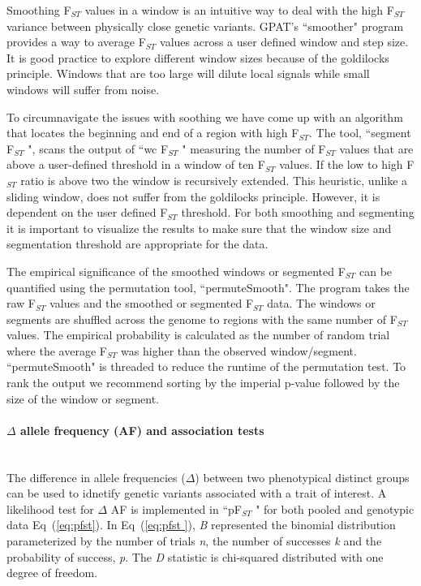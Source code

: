 \documentclass[10pt,letterpaper]{article}
\begin{document}
Smoothing F$_{ST}$  values in a window is an intuitive way to deal with the high F$_{ST}$ variance between physically close genetic variants.  GPAT's ``smoother" program provides a way to average  F$_{ST}$  values across a user defined window and step size.  It is good practice to explore different window sizes because of the goldilocks principle. Windows that are too large will dilute local signals while small windows will suffer from noise.

To circumnavigate the issues with soothing we have come up with an algorithm that locates the beginning and end of a region with high  F$_{ST}$.  The tool, ``segment F$_{ST}$ ", scans the output of ``wc F$_{ST}$ " measuring the number of  F$_{ST}$  values that are above a user-defined threshold in a window of ten F$_{ST}$ values.  If the low to high  F$_{ST}$  ratio is above two the window is recursively extended.  This heuristic, unlike a sliding window, does not suffer from the goldilocks principle.  However, it is dependent on the user defined F$_{ST}$ threshold.  For both smoothing and segmenting it is important to visualize the results to make sure that the window size and segmentation threshold are appropriate for the data.

The empirical significance of the smoothed windows or segmented  F$_{ST}$ can be quantified using the permutation tool, ``permuteSmooth".  The program takes the raw F$_{ST}$ values and the smoothed or segmented F$_{ST}$  data.  The windows or segments are shuffled across the genome to regions with the same number of  F$_{ST}$  values.  The empirical probability is calculated as the number of random trial where the average  F$_{ST}$  was higher than the observed window/segment.  ``permuteSmooth" is threaded to reduce the runtime of the permutation test.  To rank the output we recommend sorting by the imperial p-value followed by the size of the window or segment.

\paragraph*{$\Delta$ allele frequency (AF) and association tests} \mbox{} \\

The difference in allele frequencies ($\Delta$) between two phenotypical distinct groups can be used to idnetify genetic variants associated with a trait of interest.  A likelihood test for $\Delta$ AF is implemented in ``pF$_{ST}$ " for both pooled and genotypic data Eq~(\ref{eq:pfst}).   In Eq~(\ref{eq:pfst }), \textit{B} represented the binomial distribution parameterized by the number of trials \textit{n}, the number of successes \textit{k} and the probability of success, \textit{p}.  The \textit{D} statistic is chi-squared distributed with one degree of freedom.
\end{document}
